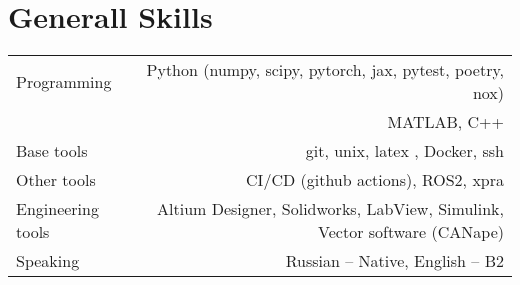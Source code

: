 \section*{Generall Skills}
\begin{tabular}{@{}L!{\VRule}R}
    Programming    & Python (numpy, scipy, pytorch, jax, pytest, poetry, nox) \\
    & MATLAB, C++                    \\
    Base tools & git, unix, latex , Docker, ssh \\
    Other tools &  CI/CD (github actions), ROS2, xpra \\
    Engineering tools &  Altium Designer, Solidworks, LabView, Simulink, Vector software (CANape) \\
    Speaking      & Russian -- Native, English -- B2                      \\
\end{tabular}